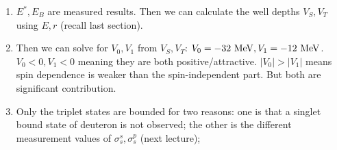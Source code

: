 \documentclass{school-22.101-notes}
\begin{document}
\begin{enumerate}
\begin{enumerate}
\item $E^*, E_B$ are measured results. Then we can calculate the well depths $V_S, V_T$ using $E, r$ (recall last section). 

\item Then we can solve for $V_0, V_1$ from $V_S, V_T$: $V_0 = -32 \mbox{ } \mathrm{MeV}, V_1 = -12 \mbox{ } \mathrm{MeV}$. $V_0 <0, V_1 <0$ meaning they are both positive/attractive. $|V_0| > |V_1|$ means spin dependence is weaker than the spin-independent part. But both are significant contribution. 

\item Only the triplet states are bounded for two reasons: one is that a singlet bound state of deuteron is not observed; the other is the different measurement values of $\sigma_s^s, \sigma_s^p$ (next lecture);

\end{enumerate} 
\end{enumerate}
\end{document}
